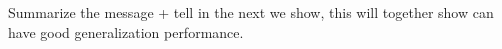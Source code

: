 




Summarize the message + tell in the next we show, this will together show can have good generalization performance.





